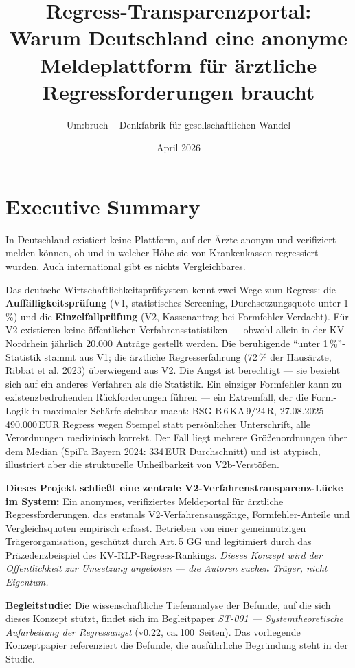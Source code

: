 \documentclass{umbruch-position}
\title{Regress-Transparenzportal:\\Warum Deutschland eine anonyme Meldeplattform für ärztliche Regressforderungen braucht}
\author{Um:bruch -- Denkfabrik für gesellschaftlichen Wandel}
\date{April 2026}
\begin{document}
\maketitle
\newpage
\tableofcontents
\newpage




\section{Executive Summary}

In Deutschland existiert keine Plattform, auf der Ärzte anonym und verifiziert melden können, ob und in welcher Höhe sie von Krankenkassen regressiert wurden. Auch international gibt es nichts Vergleichbares.

Das deutsche Wirtschaftlichkeitsprüfsystem kennt zwei Wege zum Regress: die \textbf{Auffälligkeitsprüfung} (V1, statistisches Screening, Durchsetzungsquote unter 1\,\%) und die \textbf{Einzelfallprüfung} (V2, Kassenantrag bei Formfehler-Verdacht). Für V2 existieren keine öffentlichen Verfahrensstatistiken --- obwohl allein in der KV Nordrhein jährlich 20.000 Anträge gestellt werden. Die beruhigende ``unter 1\,\%''-Statistik stammt aus V1; die ärztliche Regresserfahrung (72\,\% der Hausärzte, Ribbat et al. 2023) überwiegend aus V2. Die Angst ist berechtigt --- sie bezieht sich auf ein anderes Verfahren als die Statistik. Ein einziger Formfehler kann zu existenzbedrohenden Rückforderungen führen --- ein Extremfall, der die Form-Logik in maximaler Schärfe sichtbar macht: BSG B\,6\,KA\,9/24\,R, 27.08.2025 --- 490.000\,EUR Regress wegen Stempel statt persönlicher Unterschrift, alle Verordnungen medizinisch korrekt. Der Fall liegt mehrere Größenordnungen über dem Median (SpiFa Bayern 2024: 334\,EUR Durchschnitt) und ist atypisch, illustriert aber die strukturelle Unheilbarkeit von V2b-Verstößen.

\textbf{Dieses Projekt schließt eine zentrale V2-Verfahrenstransparenz-Lücke im System:} Ein anonymes, verifiziertes Meldeportal für ärztliche Regressforderungen, das erstmals V2-Verfahrensausgänge, Formfehler-Anteile und Vergleichsquoten empirisch erfasst. Betrieben von einer gemeinnützigen Trägerorganisation, geschützt durch Art.\,5 GG und legitimiert durch das Präzedenzbeispiel des KV-RLP-Regress-Rankings. \textit{Dieses Konzept wird der Öffentlichkeit zur Umsetzung angeboten --- die Autoren suchen Träger, nicht Eigentum.}

\textbf{Begleitstudie:} Die wissenschaftliche Tiefenanalyse der Befunde, auf die sich dieses Konzept stützt, findet sich im Begleitpaper \textit{ST-001 — Systemtheoretische Aufarbeitung der Regressangst} (v0.22, ca.\,100~Seiten). Das vorliegende Konzeptpapier referenziert die Befunde, die ausführliche Begründung steht in der Studie.
\end{document}
